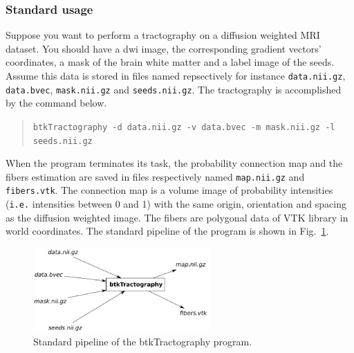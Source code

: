     \subsubsection*{Standard usage}
        Suppose you want to perform a tractography on a diffusion weighted MRI dataset. You should have a dwi image, the corresponding gradient vectors' coordinates, a mask of the brain white matter and a label image of the seeds. Assume this data is stored in files named repsectively for instance \texttt{data.nii.gz}, \texttt{data.bvec}, \texttt{mask.nii.gz} and \texttt{seeds.nii.gz}. The tractography is accomplished by the command below.
            \begin{quote}
                \texttt{btkTractography -d data.nii.gz -v data.bvec -m mask.nii.gz -l seeds.nii.gz}
            \end{quote}
        When the program terminates its task, the probability connection map and the fibers estimation are saved in files respectively named \texttt{map.nii.gz} and \texttt{fibers.vtk}. The connection map is a volume image of probability intensities (\texttt{i.e.} intensities between 0 and 1) with the same origin, orientation and spacing as the diffusion weighted image. The fibers are polygonal data of VTK library in world coordinates. The standard pipeline of the program is shown in Fig.~\ref{btkTractography-fig:standard-pipeline}.
            \begin{figure}
                \centering
                \includegraphics[width=0.6\textwidth]{btkTractographyPipeline}
                \caption{Standard pipeline of the btkTractography program.}
                \label{btkTractography-fig:standard-pipeline}
            \end{figure}

